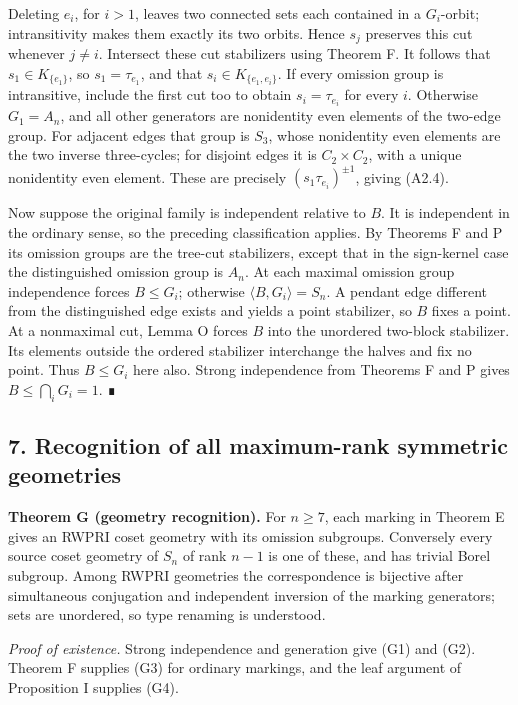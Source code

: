 \documentclass[
  10pt,
  letterpaper,
]{article}
\begin{document}
Deleting \(e_i\), for \(i>1\), leaves two connected sets each contained
in a \(G_i\)-orbit; intransitivity makes them exactly its two orbits.
Hence \(s_j\) preserves this cut whenever \(j\ne i\). Intersect these
cut stabilizers using Theorem F. It follows that \(s_1\in K_{\{e_1\}}\),
so \(s_1=\tau_{e_1}\), and that \(s_i\in K_{\{e_1,e_i\}}\). If every
omission group is intransitive, include the first cut too to obtain
\(s_i=\tau_{e_i}\) for every \(i\). Otherwise \(G_1=A_n\), and all other
generators are nonidentity even elements of the two-edge group. For
adjacent edges that group is \(S_3\), whose nonidentity even elements
are the two inverse three-cycles; for disjoint edges it is
\(C_2\times C_2\), with a unique nonidentity even element. These are
precisely \((s_1\tau_{e_i})^{\pm1}\), giving (A2.4).

Now suppose the original family is independent relative to \(B\). It is
independent in the ordinary sense, so the preceding classification
applies. By Theorems F and P its omission groups are the tree-cut
stabilizers, except that in the sign-kernel case the distinguished
omission group is \(A_n\). At each maximal omission group independence
forces \(B\leq G_i\); otherwise \(\langle B,G_i\rangle=S_n\). A pendant
edge different from the distinguished edge exists and yields a point
stabilizer, so \(B\) fixes a point. At a nonmaximal cut, Lemma O forces
\(B\) into the unordered two-block stabilizer. Its elements outside the
ordered stabilizer interchange the halves and fix no point. Thus
\(B\leq G_i\) here also. Strong independence from Theorems F and P gives
\(B\leq\bigcap_iG_i=1\). ∎

\subsection{7. Recognition of all maximum-rank symmetric
geometries}\label{recognition-of-all-maximum-rank-symmetric-geometries}

\textbf{Theorem G (geometry recognition).} For \(n\geq7\), each marking
in Theorem E gives an RWPRI coset geometry with its omission subgroups.
Conversely every source coset geometry of \(S_n\) of rank \(n-1\) is one
of these, and has trivial Borel subgroup. Among RWPRI geometries the
correspondence is bijective after simultaneous conjugation and
independent inversion of the marking generators; sets are unordered, so
type renaming is understood.

\emph{Proof of existence.} Strong independence and generation give (G1)
and (G2). Theorem F supplies (G3) for ordinary markings, and the leaf
argument of Proposition I supplies (G4).
\end{document}
